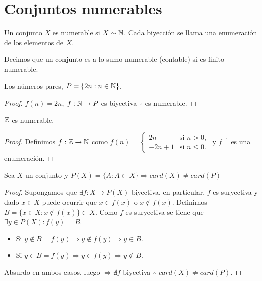 \section{Conjuntos numerables}

\begin{definition}
	Un conjunto \(X\) es numerable si \(X \sim \mathbb{N} \). Cada biyección se llama una enumeración de los elementos de \(X\).
\end{definition}

\begin{definition}
	Decimos que un conjunto es a lo sumo numerable (contable) si es finito numerable.
\end{definition}

\begin{eg}
	Los números pares, \(P = \{ 2n:n \in \mathbb{N} \} \).
	\begin{proof}
		\(f(n) = 2n\), \(f: \mathbb{N} \to P\) es biyectiva \(\therefore \) es numerable.
	\end{proof}
\end{eg}

\begin{eg}
	\(\mathbb{Z} \) es numerable.
	\begin{proof}
		Definimos \(f: \mathbb{Z} \to \mathbb{N} \) como \(f(n) = \begin{cases}
			2n    & \text{si } n >0,     \\
			-2n+1 & \text{si } n \leq 0.
		\end{cases} \) y \(f^{-1} \) es una enumeración.
	\end{proof}
\end{eg}

\begin{theorem}
	Sea \(X\) un conjunto y \(P(X) = \{ A : A \subset X \} \Rightarrow card(X) \neq card(P)\)
	\begin{proof}
		Supongamos que \(\exists f:X \to P(X)\) biyectiva, en particular, \(f\) es suryectiva y dado \(x \in X \) puede ocurrir que \(x \in f(x)\) o \(x \notin f(x)\). Definimos \(B = \{ x \in X: x \notin f(x) \} \subset X\). Como \(f\) es suryectiva se tiene que \(\exists y \in P(X): f(y) = B\).\begin{itemize}
			\item Si \(y \notin B=f(y) \Rightarrow y \notin f(y) \Rightarrow y \in B\).
			\item Si \(y \in B = f(y) \Rightarrow y \in f(y) \Rightarrow y \notin B\).
		\end{itemize}
		Absurdo en ambos casos, luego \(\Rightarrow \nexists f\) biyectiva \(\therefore \) \(card(X) \neq card(P)\).
	\end{proof}
\end{theorem}

